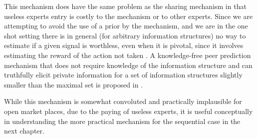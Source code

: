 This mechanism does have the same problem as the sharing mechanism in that useless experts entry is costly to the mechanism or to other experts.
Since we are attempting to avoid the use of a prior by the mechanism, and we are in the one shot setting there is in general (for arbitrary information structures) no way to estimate if a given signal is worthless, even when it is pivotal, since it involves estimating the reward of the action not taken \cite{della2012crowd,waggoner2014output, witkowski2014robust}.
A knowledge-free peer prediction mechanism that does not require knowledge of the information structure and
can truthfully elicit private information for a set of information structures slightly smaller than the maximal set is proposed in \cite{zhang2014elicitability}. 


While this mechanism is somewhat convoluted and practically implausible for open market places, due to the paying of useless experts, it is useful conceptually in understanding the more practical mechanism for the sequential case in the next chapter.







